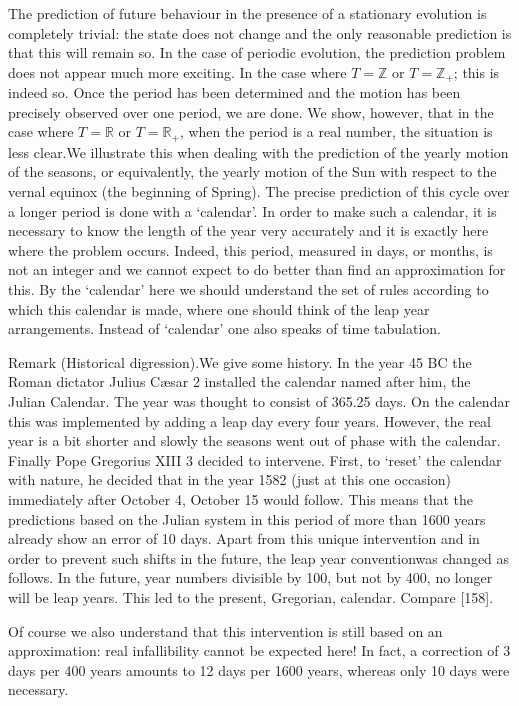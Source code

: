 \documentclass{article}
\begin{document}
The prediction of future behaviour in the presence of a stationary evolution is
completely trivial: the state does not change and the only reasonable prediction is
that this will remain so. In the case of periodic evolution, the prediction problem
does not appear much more exciting. In the case where $T = \mathbb{Z}$ or $T = \mathbb{Z}_{+}$; this is
indeed so. Once the period has been determined and the motion has been precisely
observed over one period, we are done. We show, however, that in the case where 
$T = \mathbb{R}$ or $T = \mathbb{R}_{+}$, when the period is a real number, the situation is less clear.We
illustrate this when dealing with the prediction of the yearly motion of the seasons,
or equivalently, the yearly motion of the Sun with respect to the vernal equinox (the
beginning of Spring). The precise prediction of this cycle over a longer period is
done with a ‘calendar’. In order to make such a calendar, it is necessary to know the
length of the year very accurately and it is exactly here where the problem occurs.
Indeed, this period, measured in days, or months, is not an integer and we cannot
expect to do better than find an approximation for this. By the ‘calendar’ here we
should understand the set of rules according to which this calendar is made, where
one should think of the leap year arrangements. Instead of ‘calendar’ one also speaks
of time tabulation.

\hfill

Remark (Historical digression).We give some history. In the year 45 BC the Roman
dictator Julius Cæsar 2 installed the calendar named after him, the Julian Calendar.
The year was thought to consist of 365.25 days. On the calendar this was implemented
by adding a leap day every four years. However, the real year is a bit shorter
and slowly the seasons went out of phase with the calendar. Finally Pope Gregorius
XIII 3 decided to intervene. First, to ‘reset’ the calendar with nature, he decided that
in the year 1582 (just at this one occasion) immediately after October 4, October
15 would follow. This means that the predictions based on the Julian system in this
period of more than 1600 years already show an error of 10 days. Apart from this
unique intervention and in order to prevent such shifts in the future, the leap year
conventionwas changed as follows. In the future, year numbers divisible by 100, but
not by 400, no longer will be leap years. This led to the present, Gregorian, calendar.
Compare [158].

\hfill

Of course we also understand that this intervention is still based on an approximation:
real infallibility cannot be expected here! In fact, a correction of 3 days per
400 years amounts to 12 days per 1600 years, whereas only 10 days were necessary.
\end{document}
